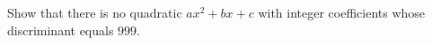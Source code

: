Show that there is no quadratic $ax^2+bx+c$ with integer coefficients whose discriminant equals $999$.
